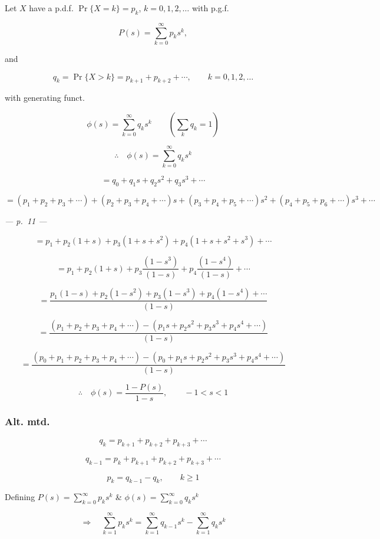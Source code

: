 \documentclass[
]{article}
\begin{document}
Let \(X\) have a p.d.f. \(\Pr\{X = k\} = p_k\), \(k = 0, 1, 2, \ldots\)
with p.g.f.

\[P(s) = \sum_{k=0}^{\infty} p_k s^k,\]

and

\[q_k = \Pr\{X > k\} = p_{k+1} + p_{k+2} + \cdots, \qquad k = 0, 1, 2, \ldots\]

with generating funct.

\[\phi(s) = \sum_{k=0}^{\infty} q_k s^k \qquad \left( \sum_k q_k = 1 \right)\]

\[\therefore \quad \phi(s) = \sum_{k=0}^{\infty} q_k s^k\]

\[= q_0 + q_1 s + q_2 s^2 + q_3 s^3 + \cdots\]

\[= (p_1 + p_2 + p_3 + \cdots) + (p_2 + p_3 + p_4 + \cdots) s + (p_3 + p_4 + p_5 + \cdots) s^2 + (p_4 + p_5 + p_6 + \cdots) s^3 + \cdots\]

\emph{--- p.~11 ---}

\[= p_1 + p_2(1+s) + p_3\left(1 + s + s^2\right) + p_4\left(1 + s + s^2 + s^3\right) + \cdots\]

\[= p_1 + p_2(1+s) + p_3 \frac{\left(1 - s^3\right)}{(1-s)} + p_4 \frac{\left(1 - s^4\right)}{(1-s)} + \cdots\]

\[= \frac{p_1(1-s) + p_2\left(1 - s^2\right) + p_3\left(1 - s^3\right) + p_4\left(1 - s^4\right) + \cdots}{(1-s)}\]

\[= \frac{(p_1 + p_2 + p_3 + p_4 + \cdots) - \left(p_1 s + p_2 s^2 + p_3 s^3 + p_4 s^4 + \cdots\right)}{(1-s)}\]

\[= \frac{(p_0 + p_1 + p_2 + p_3 + p_4 + \cdots) - \left(p_0 + p_1 s + p_2 s^2 + p_3 s^3 + p_4 s^4 + \cdots\right)}{(1-s)}\]

\[\therefore \quad \phi(s) = \frac{1 - P(s)}{1 - s}, \qquad -1 < s < 1\]

\subsubsection{Alt. mtd.}\label{alt.-mtd.}

\[q_k = p_{k+1} + p_{k+2} + p_{k+3} + \cdots\]

\[q_{k-1} = p_k + p_{k+1} + p_{k+2} + p_{k+3} + \cdots\]

\[p_k = q_{k-1} - q_k, \qquad k \ge 1\]

Defining \(P(s) = \sum_{k=0}^{\infty} p_k s^k\) \&
\(\phi(s) = \sum_{k=0}^{\infty} q_k s^k\)

\[\Rightarrow \quad \sum_{k=1}^{\infty} p_k s^k = \sum_{k=1}^{\infty} q_{k-1} s^k - \sum_{k=1}^{\infty} q_k s^k\]
\end{document}
